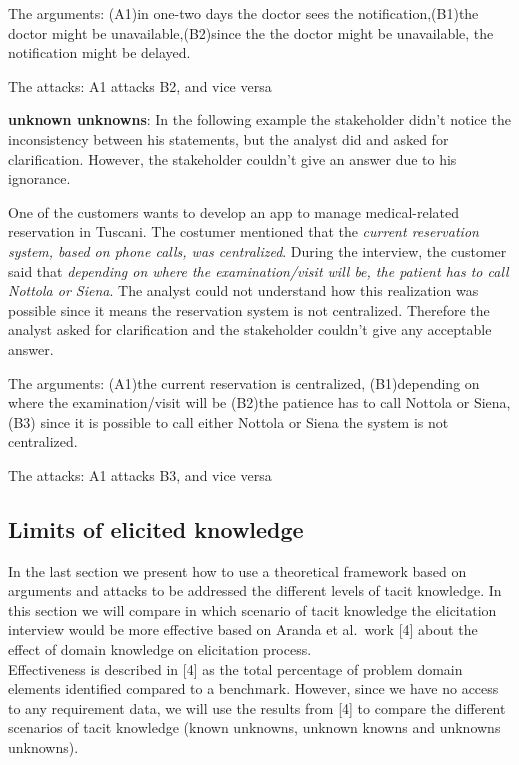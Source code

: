 \documentclass[]{llncs}
\begin{document}
The arguments: (A1)in one-two days the doctor sees the
notification,(B1)the doctor might be unavailable,(B2)since the the
doctor might be unavailable, the notification might be delayed.

The attacks: A1 attacks B2, and vice versa

\textbf{unknown unknowns}: In the following example the stakeholder
didn't notice the inconsistency between his statements, but the analyst
did and asked for clarification. However, the stakeholder couldn't give
an answer due to his ignorance.

One of the customers wants to develop an app to manage medical-related
reservation in Tuscani. The costumer mentioned that the \emph{current
reservation system, based on phone calls, was centralized}. During the
interview, the customer said that \emph{depending on where the
examination/visit will be, the patient has to call Nottola or Siena}.
The analyst could not understand how this realization was possible since
it means the reservation system is not centralized. Therefore the
analyst asked for clarification and the stakeholder couldn't give any
acceptable answer.

The arguments: (A1)the current reservation is centralized, (B1)depending
on where the examination/visit will be (B2)the patience has to call
Nottola or Siena, (B3) since it is possible to call either Nottola or
Siena the system is not centralized.

The attacks: A1 attacks B3, and vice versa

\hypertarget{limits-of-elicited-knowledge}{%
\subsection{Limits of elicited
knowledge}\label{limits-of-elicited-knowledge}}

In the last section we present how to use a theoretical framework based
on arguments and attacks to be addressed the different levels of tacit
knowledge. In this section we will compare in which scenario of tacit
knowledge the elicitation interview would be more effective based on
Aranda et al.~work {[}4{]} about the effect of domain knowledge on
elicitation process.\\
Effectiveness is described in {[}4{]} as the total percentage of problem
domain elements identified compared to a benchmark. However, since we
have no access to any requirement data, we will use the results from
{[}4{]} to compare the different scenarios of tacit knowledge (known
unknowns, unknown knowns and unknowns unknowns).
\end{document}
